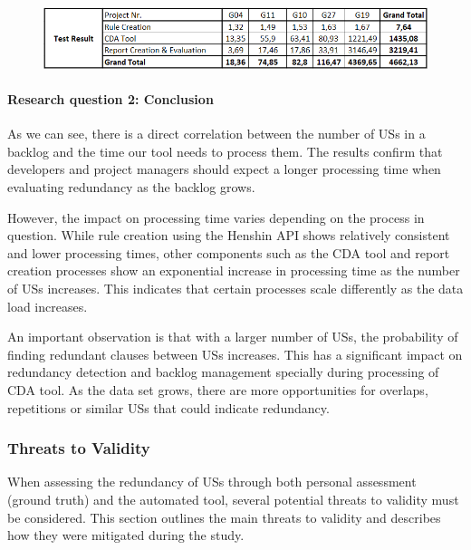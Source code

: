 	\begin{figure}[h]
	\begingroup
	\scriptsize
	\centering
	\includegraphics[scale=0.7]{Table/performance_result.png}
	\label{tb:performance_result}
	\endgroup
\end{figure}
\paragraph{Research question 2: Conclusion}As we can see, there is a direct correlation between the number of USs in a backlog and the time our tool needs to process them. The results confirm that developers and project managers should expect a longer processing time when evaluating redundancy as the backlog grows.

However, the impact on processing time varies depending on the process in question. While rule creation using the Henshin API shows relatively consistent and lower processing times, other components such as the CDA tool and report creation processes show an exponential increase in processing time as the number of USs increases. This indicates that certain processes scale differently as the data load increases.

An important observation is that with a larger number of USs, the probability of finding redundant clauses between USs increases. This has a significant impact on redundancy detection and backlog management specially during processing of CDA tool. As the data set grows, there are more opportunities for overlaps, repetitions or similar USs that could indicate redundancy.
\subsubsection*{Threats to Validity}
When assessing the redundancy of USs through both personal assessment (ground truth) and the automated tool, several potential threats to validity must be considered. This section outlines the main threats to validity and describes how they were mitigated during the study.
